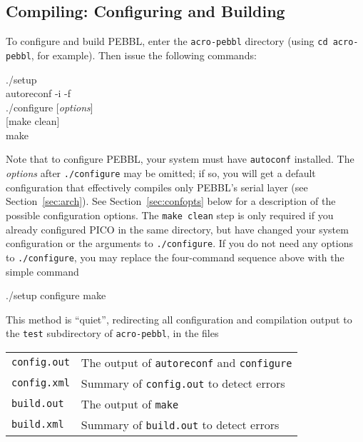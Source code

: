 \subsection{Compiling: Configuring and Building}
\label{sec:compile}
\label{sec:compiling}
To configure and build PEBBL, enter the \texttt{acro-pebbl} directory
(using \texttt{cd acro-pebbl}, for example).  Then issue the following
commands:
\begin{codeblock}
./setup \\
autoreconf -i -f \\
./configure \textrm{[\emph{options}]} \\
\textrm{[}make clean\textrm{]} \\
make
\end{codeblock}
Note that to configure PEBBL, your system must have \texttt{autoconf}
installed.  The \emph{options} after \texttt{./configure} may be
omitted; if so, you will get a default configuration that effectively
compiles only PEBBL's serial layer (see Section~\ref{sec:arch}).  See
Section~\ref{sec:confopts} below for a description of the possible
configuration options.  The \texttt{make clean} step is only required
if you already configured PICO in the same directory, but have changed
your system configuration or the arguments to \texttt{./configure}.
If you do not need any options to \texttt{./configure}, you may
replace the four-command sequence above with the simple command
\begin{codeblock}
./setup configure make
\end{codeblock}
This method is ``quiet'', redirecting all configuration and
compilation output to the \texttt{test} subdirectory of
\texttt{acro-pebbl}, in the files
\begin{center}
\begin{tabular}{ll}
   \texttt{config.out} & The output of \texttt{autoreconf} 
                         and \texttt{configure} \\
   \texttt{config.xml} & Summary of \texttt{config.out} to detect errors\\
   \texttt{build.out} & The output of \texttt{make}\\
   \texttt{build.xml} & Summary of \texttt{build.out} to detect errors\\
\end{tabular}
\end{center}


